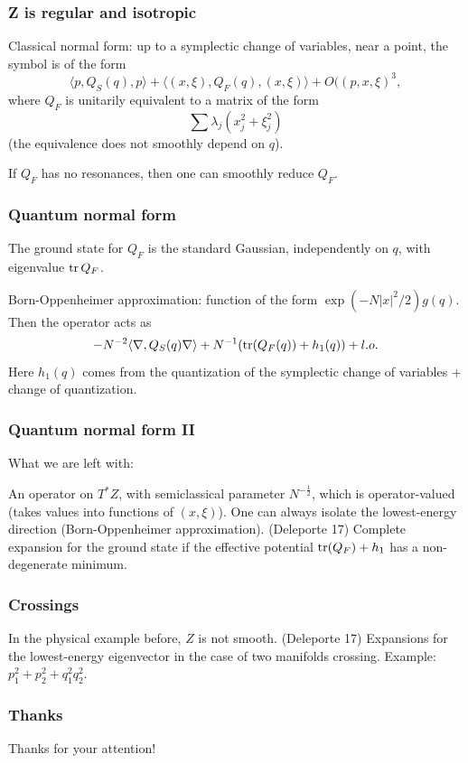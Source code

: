 \documentclass[mathserif]{beamer}
\begin{document}
\begin{frame}
  \frametitle{Z is regular and isotropic}
  Classical normal form: up to a symplectic change of variables, near
  a point, the symbol is of the form
  \[
    \langle p,Q_S(q),p\rangle +\langle
    (x,\xi),Q_F(q),(x,\xi)\rangle+O((p,x,\xi)^3,\]
  where $Q_F$ is unitarily equivalent to a matrix of the form
  \[
    \sum \lambda_j (x_j^2+\xi_j^2)
  \]
  (the
  equivalence does not smoothly depend on $q$).

  If $Q_F$ has no resonances, then one can smoothly reduce $Q_F$.
\end{frame}

\begin{frame}
  \frametitle{Quantum normal form}
  The ground state for $Q_F$ is the standard Gaussian, independently
  on $q$, with eigenvalue $\operatorname{tr} Q_F$.
  \vfill

  Born-Oppenheimer approximation: function of the form
  $\exp(-N|x|^2/2)g(q)$. Then the operator acts as
  \[
    -N^{-2}\langle \nabla,Q_S(q)
      \nabla\rangle+N^{-1}(\operatorname{tr}(Q_F(q))+h_1(q))+l.o.\]
  Here $h_1(q)$ comes from the quantization of the symplectic change
  of variables + change of quantization.
\end{frame}

\begin{frame}
  \frametitle{Quantum normal form II}
  What we are left with:
  
  An operator on $T^*Z$, with semiclassical parameter $N^{-\frac 12}$,
  which is {\color{myorange} operator-valued} (takes values into
  functions of $(x,\xi)$). One can always isolate the lowest-energy
  direction (Born-Oppenheimer approximation).
  \vfill
  (Deleporte 17) Complete expansion for the ground state if the
  effective potential $\operatorname{tr}(Q_F)+h_1$ has a non-degenerate minimum.
\end{frame}

\begin{frame}
  \frametitle{Crossings}
  In the physical example before, $Z$ is not smooth.
  \vfill
  (Deleporte 17) Expansions for the lowest-energy eigenvector in the
  case of two manifolds crossing.
  \vfill
  Example: $p_1^2+p_2^2+q_1^2q_2^2$.
\end{frame}

  \begin{frame}
    \frametitle{Thanks}
    \centering 
    {\Large Thanks for your attention!}
  \end{frame}
  
\end{document}
